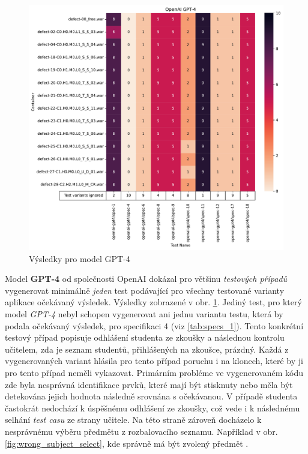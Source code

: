 \documentclass[czech, ma, kiv, he, iso690alph, pdf, viewonly]{fasthesis}
\begin{document}
            \begin{figure}
                \includegraphics[width=\textwidth]{pic/gpt-4-results.pdf}
                \caption{Výsledky pro model GPT-4}
                \label{fig:res:gpt-4}
            \end{figure}

            Model \textbf{GPT-4} od společnosti OpenAI dokázal pro většinu \textit{testových případů} vygenerovat minimálně \emph{jeden} test podávající pro všechny testované varianty aplikace očekávaný výsledek. Výsledky zobrazené v obr. \ref{fig:res:gpt-4}. Jediný test, pro který model \textit{GPT-4} nebyl schopen vygenerovat ani jednu variantu testu, která by podala očekávaný výsledek, pro specifikaci 4 (viz \ref{tab:specs_1}). Tento konkrétní testový případ popisuje odhlášení studenta ze zkoušky a následnou kontrolu učitelem, zda je seznam studentů, přihlášených na zkoušce, prázdný. Každá z vygenerovaných variant hlásila pro tento případ poruchu i na klonech, které by ji pro tento případ neměli vykazovat. Primárním probléme ve vygenerovaném kódu zde byla nesprávná identifikace prvků, které mají být stisknuty nebo měla být detekována jejich hodnota následně srovnána s očekávanou. V případě studenta častokrát nedochází k úspěšnému odhlášení ze zkoušky, což vede i k následnému selhání \textit{test casu} ze strany učitele. Na této straně zároveň docházelo k nesprávnému výběru předmětu z rozbalovacího seznamu. Například v obr. \ref{fig:wrong_subject_select}, kde správně má být zvolený předmět .
\end{document}
